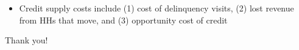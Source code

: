 \documentclass[aspectratio=149]{beamer}
\begin{document}
\begin{frame}
{} %


\begin{itemize}
   \item Credit supply costs include (1) cost of delinquency visits, (2) lost revenue from HHs that move, and (3) opportunity cost of credit
\end{itemize}

\end{frame}



\begin{frame}


\vspace{2mm}
Thank you!

\end{frame}
\end{document}
